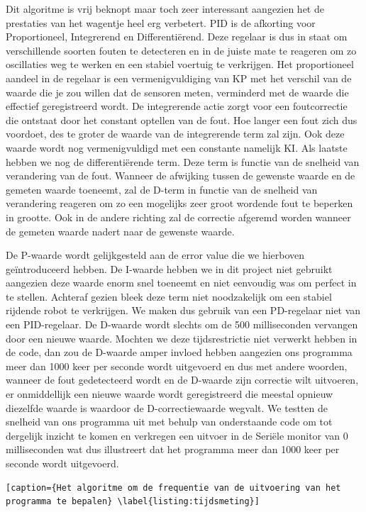 Dit algoritme is vrij beknopt maar toch zeer interessant aangezien het de prestaties van het wagentje heel erg verbetert. PID is de afkorting voor Proportioneel, Integrerend en Differenti\"erend. Deze regelaar is dus in staat om verschillende soorten fouten te detecteren en in de juiste mate te reageren om zo oscillaties weg te werken en een stabiel voertuig te verkrijgen. Het proportioneel aandeel in de regelaar is een vermenigvuldiging van KP met het verschil van de waarde die je zou willen dat de sensoren meten, verminderd met de waarde die effectief geregistreerd wordt. De integrerende actie zorgt voor een foutcorrectie die ontstaat door het constant optellen van de fout. Hoe langer een fout zich dus voordoet, des te groter de waarde van de integrerende term zal zijn. Ook deze waarde wordt nog vermenigvuldigd met een constante namelijk KI. Als laatste hebben we nog de differenti\"erende term. Deze term is functie van de snelheid van verandering van de fout. Wanneer de afwijking tussen de gewenste waarde en de gemeten waarde toeneemt, zal de D-term in functie van de snelheid van verandering reageren om zo een mogelijks zeer groot wordende fout te beperken in grootte. Ook in de andere richting zal de correctie afgeremd worden wanneer de gemeten waarde nadert naar de gewenste waarde. 

De P-waarde wordt gelijkgesteld aan de error value die we hierboven ge\"introduceerd hebben. De I-waarde hebben we in dit project niet gebruikt aangezien deze waarde enorm snel toeneemt en niet eenvoudig was om perfect in te stellen. Achteraf gezien bleek deze term niet noodzakelijk om een stabiel rijdende robot te verkrijgen. We maken dus gebruik van een PD-regelaar niet van een PID-regelaar. De D-waarde wordt slechts om de 500 milliseconden vervangen door een nieuwe waarde. Mochten we deze tijdsrestrictie niet verwerkt hebben in de code, dan zou de D-waarde amper invloed hebben aangezien ons programma meer dan 1000 keer per seconde wordt uitgevoerd en dus met andere woorden, wanneer de fout gedetecteerd wordt en de D-waarde zijn correctie wilt uitvoeren, er onmiddellijk een nieuwe waarde wordt geregistreerd die meestal opnieuw diezelfde waarde is waardoor de D-correctiewaarde wegvalt. We testten de snelheid van ons programma uit met behulp van onderstaande code om tot dergelijk inzicht te komen en verkregen een uitvoer in de Seri\"ele monitor van 0 milliseconden wat dus illustreert dat het programma meer dan 1000 keer per seconde wordt uitgevoerd.


\begin{lstlisting}[caption={Het algoritme om de frequentie van de uitvoering van het programma te bepalen} \label{listing:tijdsmeting}]
\end{lstlisting}

